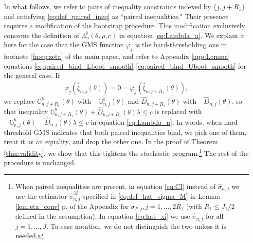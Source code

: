 \documentclass[letterpaper,11pt]{article}
\theoremstyle{myplain}
\theoremstyle{mydefinition}
\theoremstyle{myremark}
\numberwithin{equation}{section}
\numberwithin{figure}{section}
\begin{document}
\begin{appendices}
In what follows, we refer to pairs of inequality constraints indexed by $\{j,j+R_1\}$ and satisfying \eqref{eq:def_paired_ineq} as ``paired inequalities."\label{verbal_def:paired_ineq} Their presence requires a modification of the bootstrap procedure. This modification exclusively concerns the definition of $\Lambda_n^b(\theta,\rho,c)$ in equation \eqref{eq:Lambda_n}. We explain it here for the case that the GMS function $\varphi_j$ is the hard-thresholding one in footnote \ref{fn:eq:zeta} of the main paper, and refer to Appendix \ref{app:Lemma} equations \eqref{eq:paired_bind_Lboot_smooth}-\eqref{eq:paired_bind_Uboot_smooth} for the general case. 
If
\begin{align*}
\varphi_j(\hat{\xi}_{n,j}(\theta))=0 = \varphi_j(\hat{\xi}_{n,j+R_1}(\theta)),
\end{align*}
we replace $\mathbb{G}_{n,j+R_1}^{b}(\theta )$ with $-\mathbb{G}_{n,j}^{b}(\theta )$ and $\hat{D}_{n,j+R_1}(\theta)$ with $-\hat{D}_{n,j}(\theta)$, so that inequality $\mathbb{G}_{n,j+R_1}^{b}(\theta )+\hat{D}_{n,j+R_1}(\theta)\lambda  \le c$ is replaced with $-\mathbb{G}_{n,j}^{b}(\theta )-\hat{D}_{n,j}(\theta)\lambda \le c$ in equation \eqref{eq:Lambda_n}. In words, when hard threshold GMS indicates that both paired inequalities bind, we pick one of them, treat it as an equality, and drop the other one. In the proof of Theorem \ref{thm:validity}, we show that this tightens the stochastic program.\footnote{When paired inequalities are present, in equation \eqref{eq:CI} instead of $\hat{\sigma}_{n,j}$ we use the estimator $\hat{\sigma}^M_{n,j}$ specified in \eqref{eq:def_hat_sigma_M} in Lemma \ref{lem:eta_conv} p.\pageref{eq:def_hat_sigma_M} of the Appendix for $\sigma_{P,j},j=1,\dots,2R_1$ (with $R_1 \le J_1/2$ defined in the assumption). In equation \eqref{eq:hat_xi} we use $\hat{\sigma}_{n,j}$ for all $j=1,\dots,J$. To ease notation, we do not distinguish the two unless it is needed.} 
The rest of the procedure is unchanged.



\end{appendices}
\end{document}
